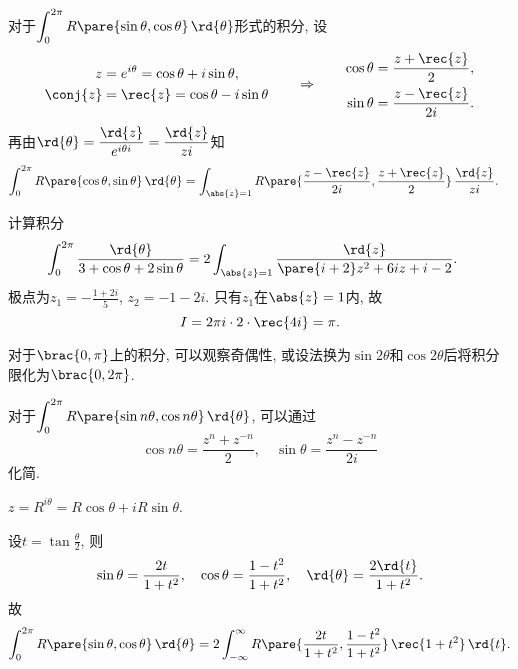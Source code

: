 \documentclass[../ComplexVariable.tex]{subfiles}
\begin{document}
对于$\displaystyle \int_0^{2\pi} R\pare{\sin\theta,\cos\theta}\,\rd{\theta}$形式的积分, 设
\[ \begin{aligned}
    z &= e^{i\theta} = \cos\theta + i\sin\theta, \\ 
    \conj{z} &= \rec{z} = \cos\theta - i\sin\theta
\end{aligned} \qquad \Rightarrow \qquad \begin{aligned}
    \cos\theta &= \frac{z+ \rec{z}}{2}, \\
    \sin\theta &= \frac{z - \rec{z}}{2i}.
\end{aligned} \]
再由$\displaystyle \rd{\theta} = \frac{\rd{z}}{e^{i\theta i}} = \frac{\rd{z}}{zi}$知
\begin{align*}
    \int_0^{2\pi} R\pare{\cos\theta,\sin\theta}\,\rd{\theta} &= \int_{\abs{z} = 1} R\pare{\frac{z-\rec{z}}{2i}, \frac{z+\rec{z}}{2}}\,\frac{\rd{z}}{zi}.
\end{align*}
\begin{sample}
    \begin{ex}
        计算积分
        \begin{align*}
            \int_0^{2\pi} \frac{\rd{\theta}}{3 + \cos\theta + 2\sin\theta} &= 2\int_{\abs{z} = 1} \frac{\rd{z}}{\pare{i+2}z^2 + 6iz + i-2}.
        \end{align*}
        极点为$\displaystyle z_1 = -\frac{1+2i}{5}$, $\displaystyle z_2 = -1-2i$. 只有$z_1$在$\abs{z}=1$内, 故
        \[ I = 2\pi i\cdot 2 \cdot \rec{4i} = \pi. \]
    \end{ex}
\end{sample}
\begin{remark}
    对于$\brac{0,\pi}$上的积分, 可以观察奇偶性, 或设法换为$\sin 2\theta$和$\cos 2\theta$后将积分限化为$\brac{0, 2\pi}$.
\end{remark}
\begin{remark}
    对于$\displaystyle \int_0^{2\pi} R\pare{\sin n\theta,\cos n\theta}\,\rd{\theta}$, 可以通过
    \[ \cos n\theta = \frac{z^n + z^{-n}}{2},\quad \sin\theta = \frac{z^n - z^{-n}}{2i} \]
    化简.
\end{remark}
\begin{remark}
    $z = R^{i\theta} = R\cos\theta + iR\sin\theta$.
\end{remark}
\begin{remark}
    设$\displaystyle t = \tan \frac{\theta}{2}$, 则
    \[ \sin\theta = \frac{2t}{1+t^2},\quad \cos\theta = \frac{1-t^2}{1+t^2},\quad \rd{\theta} = \frac{2\rd{t}}{1+t^2}. \]
    故
    \[ \int_0^{2\pi} R\pare{\sin\theta,\cos\theta} \,\rd{\theta} = 2\int_{-\infty}^{\infty} R\pare{\frac{2t}{1+t^2},\frac{1-t^2}{1+t^2}}\,\rec{1+t^2}\,\rd{t}. \]
\end{remark}
\end{document}
